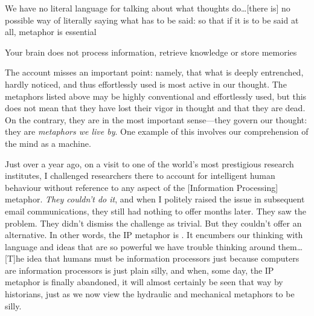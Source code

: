 \begin{singlespace}
\epigraph{We have no literal language for talking about what
  thoughts do\ldots [there is] no possible way of literally saying
  what has to be said: so that if it is to be said at all, metaphor
  is essential}{}

\epigraph{Your brain does not process information, retrieve knowledge
  or store memories}{}

\epigraph{The  account misses an important
  point: namely, that what is deeply entrenched, hardly noticed, and
  thus effortlessly used is most active in our thought.  The metaphors
  listed above may be highly conventional and effortlessly used, but
  this does not mean that they have lost their vigor in thought and
  that they are dead.  On the contrary, they are  in the
  most important sense---they govern our thought: they are
  \emph{metaphors we live by}.  One example of this involves our
  comprehension of the mind as a machine.}{}

\epigraph{Just over a year ago, on a visit to one of the world's most
  prestigious research institutes, I challenged researchers there to
  account for intelligent human behaviour without reference to any
  aspect of the [Information Processing] metaphor.  \emph{They
    couldn't do it}, and when I politely raised the issue in
  subsequent email communications, they still had nothing to offer
  months later.  They saw the problem.  They didn’t dismiss the
  challenge as trivial.  But they couldn’t offer an alternative.  In
  other words, the IP metaphor is .  It encumbers our
  thinking with language and ideas that are so powerful we have
  trouble thinking around them\ldots [T]he idea that humans must be
  information processors just because computers are information
  processors is just plain silly, and when, some day, the IP metaphor
  is finally abandoned, it will almost certainly be seen that way by
  historians, just as we now view the hydraulic and mechanical
  metaphors to be silly.}{}
\end{singlespace}
